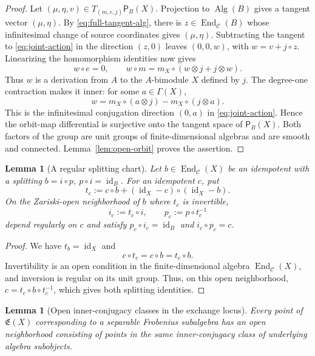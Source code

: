 \documentclass[11pt]{amsart}
\newtheorem{lemma}[theorem]{Lemma}
\theoremstyle{definition}
\theoremstyle{remark}
\newcommand{\C}{\mathcal C}
\newcommand{\Exch}{\mathfrak E}
\DeclareMathOperator{\End}{End}
\DeclareMathOperator{\Alg}{Alg}
\DeclareMathOperator{\id}{id}
\begin{document}
\begin{proof}
Let $(\mu,\eta,v)\in T_{(m,e,j)}\mathsf P_B(X)$.
Projection to $\Alg(B)$ gives a tangent vector $(\mu,\eta)$.
By \eqref{eq:full-tangent-alg}, there is $z\in\End_{\C}(B)$ whose
infinitesimal change of source coordinates gives $(\mu,\eta)$.
Subtracting the tangent to \eqref{eq:joint-action} in the direction
$(z,0)$ leaves $(0,0,w)$, with $w=v+j\circ z$.
Linearizing the homomorphism identities now gives
\[
 w\circ e=0,\qquad
 w\circ m=m_X\circ(w\otimes j+j\otimes w).
\]
Thus $w$ is a derivation from $A$ to the $A$-bimodule $X$ defined by $j$.
The degree-one contraction makes it inner: for some
$a\in\Gamma(X)$,
\[
 w=m_X\circ(a\otimes j)-m_X\circ(j\otimes a).
\]
This is the infinitesimal conjugation direction $(0,a)$ in
\eqref{eq:joint-action}.  Hence the orbit-map differential is surjective
onto the tangent space of $\mathsf P_B(X)$.  Both factors of the group
are unit groups of finite-dimensional algebras and are smooth and
connected.  Lemma~\ref{lem:open-orbit} proves the assertion.
\end{proof}


\begin{lemma}[A regular splitting chart]\label{lem:idempotent-chart}
Let $b\in\End_{\C}(X)$ be an idempotent with a splitting
$b=i\circ p$, $p\circ i=\id_B$.  For an idempotent $c$, put
\[
 t_c:=c\circ b+(\id_X-c)\circ(\id_X-b).
\]
On the Zariski-open neighborhood of $b$ where $t_c$ is invertible,
\[
 i_c:=t_c\circ i,\qquad p_c:=p\circ t_c^{-1}
\]
depend regularly on $c$ and satisfy
$p_c\circ i_c=\id_B$ and $i_c\circ p_c=c$.
\end{lemma}

\begin{proof}
We have $t_b=\id_X$ and
\[
 c\circ t_c=c\circ b=t_c\circ b.
\]
Invertibility is an open condition in the finite-dimensional algebra
$\End_{\C}(X)$, and inversion is regular on its unit group.  Thus, on
this open neighborhood, $c=t_c\circ b\circ t_c^{-1}$, which gives both
splitting identities.
\end{proof}


\begin{lemma}[Open inner-conjugacy classes in the exchange locus]
\label{lem:exchange-open-classes}
Every point of $\Exch(X)$ corresponding to a separable Frobenius
subalgebra has an open neighborhood consisting of points in the same
inner-conjugacy class of underlying algebra subobjects.
\end{lemma}
\end{document}
